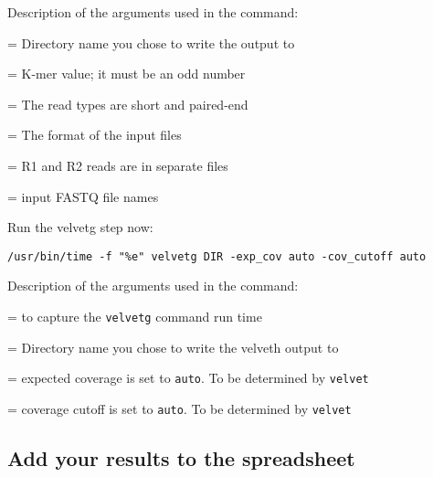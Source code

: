 Description of the arguments used in the command:
\begin{description}[style=multiline,labelindent=0cm,align=right,leftmargin=\descriptionlabelspace,rightmargin=1.5cm,font=\ttfamily]
  \item[DIR] = Directory name you chose to write the output to
  \item[K] = K-mer value; it must be an odd number
  \item[-shortPaired] = The read types are short and paired-end
  \item[-fastq.gz] = The format of the input files
  \item[-separate] = R1 and R2 reads are in separate files
  \item[input file names] = input FASTQ file names
\end{description}

\begin{steps}
Run the velvetg step now:
\begin{lstlisting}
/usr/bin/time -f "%e" velvetg DIR -exp_cov auto -cov_cutoff auto
\end{lstlisting}
\end{steps}

Description of the arguments used in the command:
\begin{description}[style=multiline,labelindent=0cm,align=right,leftmargin=\descriptionlabelspace,rightmargin=1.5cm,font=\ttfamily]
  \item[time] = to capture the \texttt{velvetg} command run time
  \item[DIR] = Directory name you chose to write the velveth output to
  \item[-exp\_cov] = expected coverage is set to \texttt{auto}. To be determined by \texttt{velvet}
  \item[-cov\_cutoff] = coverage cutoff is set to \texttt{auto}. To be determined by \texttt{velvet}
\end{description}

\subsection{Add your results to the spreadsheet}


